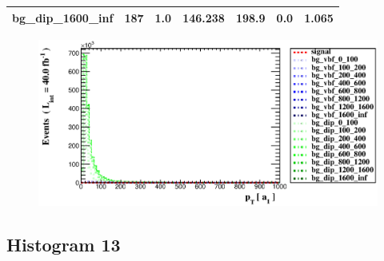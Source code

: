 \documentclass[a4paper, 10pt]{article}
\begin{document}
\begin{table}[H]
\begin{center}
\begin{tabular}{|m{23.0mm}|m{23.0mm}|m{18.0mm}|m{19.0mm}|m{19.0mm}|m{19.0mm}|m{19.0mm}|}
      \hline
      {\cellcolor{white}         bg\_dip\_1600\_inf}& {\cellcolor{white}         187}& {\cellcolor{white}         1.0}& {\cellcolor{white}         146.238}& {\cellcolor{white}         198.9}& {\cellcolor{green}         0.0}& {\cellcolor{green}         1.065}\\
\hline
    \end{tabular}
  \end{center}
\end{table}

\begin{figure}[H]
  \begin{center}
    \includegraphics[scale=0.45]{selection_11.eps}\\
\caption{   }
  \end{center}
\end{figure}
      \newpage
\subsection{ Histogram 13}
\end{document}
